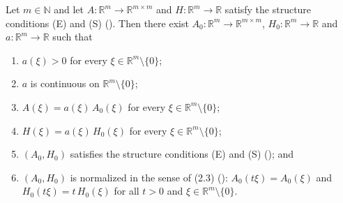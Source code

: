 \begin{theorem}
Let $m\in\mathbb N$ and let $A:\mathbb R^{m}\to\mathbb R^{m\times m}$ and
$H:\mathbb R^{m}\to\mathbb R$ satisfy the structure conditions (E) and (S)
(). Then there exist
$A_0:\mathbb R^{m}\to\mathbb R^{m\times m}$, $H_0:\mathbb R^{m}\to\mathbb R$ and
$a:\mathbb R^{m}\to\mathbb R$ such that
\begin{enumerate}
\item $a(\xi)>0$ for every $\xi\in\mathbb R^{m}\setminus\{0\}$;
\item $a$ is continuous on $\mathbb R^{m}\setminus\{0\}$;
\item $A(\xi)=a(\xi)\,A_0(\xi)$ for every $\xi\in\mathbb R^{m}\setminus\{0\}$;
\item $H(\xi)=a(\xi)\,H_0(\xi)$ for every $\xi\in\mathbb R^{m}\setminus\{0\}$;
\item $(A_0,H_0)$ satisfies the structure conditions (E) and (S)
  (); and
\item $(A_0,H_0)$ is normalized in the sense of (2.3) ():
  $A_0(t\xi)=A_0(\xi)$ and $H_0(t\xi)=t\,H_0(\xi)$ for all $t>0$ and
  $\xi\in\mathbb R^{m}\setminus\{0\}$.
\end{enumerate}
\end{theorem}
